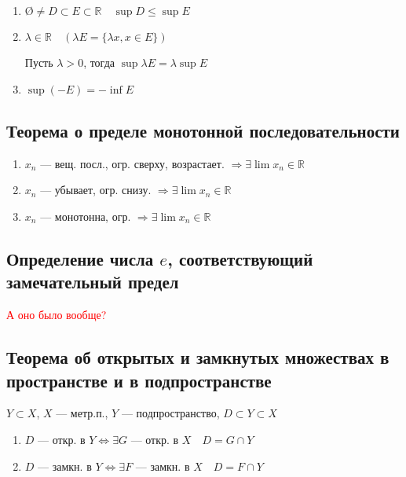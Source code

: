 \begin{enumerate}
    \item $\text{\O}\not =D\subset E\subset \mathbb{R} \quad \sup D\leq \sup E$
    \item $\lambda\in\mathbb{R} \quad (\lambda E=\{\lambda x, x\in E\})$

    Пусть $\lambda>0$, тогда $\sup \lambda E=\lambda\sup E$
    \item $\sup(-E)=-\inf E$
\end{enumerate}

\subsection{Теорема о пределе монотонной последовательности}

\begin{enumerate}
    \item $x_n$ --- вещ. посл., огр. сверху, возрастает. $\Rightarrow \exists\lim x_n\in\mathbb{R}$
    \item $x_n$ --- убывает, огр. снизу. $\Rightarrow \exists \lim x_n\in\mathbb{R}$
    \item $x_n$ --- монотонна, огр. $\Rightarrow \exists \lim x_n\in\mathbb{R}$
\end{enumerate}

\subsection{Определение числа $e$, соответствующий замечательный предел}

\textcolor{red}{А оно было вообще?}

\subsection{Теорема об открытых и замкнутых множествах в пространстве и в подпространстве}

$Y\subset X$, $X$ --- метр.п., $Y$ --- подпространство, $D\subset Y\subset X$

\begin{enumerate}
    \item $D$ --- откр. в $Y \Leftrightarrow \exists G$ --- откр. в $X \quad D=G\cap Y$
    \item $D$ --- замкн. в $Y \Leftrightarrow \exists F$ --- замкн. в $X \quad D=F\cap Y$
\end{enumerate}

